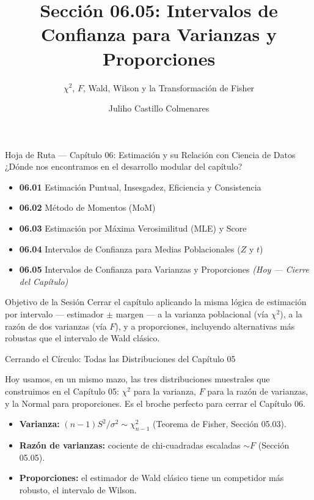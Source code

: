 \documentclass[10pt, aspectratio=169]{beamer}
\title[IC Varianzas y Proporciones]{Sección 06.05: Intervalos de Confianza para Varianzas y Proporciones}
\subtitle{$\chi^2$, $F$, Wald, Wilson y la Transformación de Fisher}
\author[J. Castillo Colmenares]{Juliho Castillo Colmenares}
\institute{Tecnológico de Monterrey}
\date{\vspace{-1.2cm}}
\begin{document}
\begin{frame}[plain]
  \vspace{-0.8cm}
  \titlepage
\end{frame}

\begin{frame}{Hoja de Ruta --- Capítulo 06: Estimación y su Relación con Ciencia de Datos}
  \footnotesize
  ¿Dónde nos encontramos en el desarrollo modular del capítulo? \pause
  \begin{itemize}\itemsep=0.08em
    \item \textbf{06.01} Estimación Puntual, Insesgadez, Eficiencia y Consistencia \pause
    \item \textbf{06.02} Método de Momentos (MoM) \pause
    \item \textbf{06.03} Estimación por Máxima Verosimilitud (MLE) y Score \pause
    \item \textbf{06.04} Intervalos de Confianza para Medias Poblacionales ($Z$ y $t$) \pause
    \item \textbf{06.05} Intervalos de Confianza para Varianzas y Proporciones \emph{(Hoy --- Cierre del Capítulo)}
  \end{itemize}
  \vspace{-0.05cm}
  \begin{block}{Objetivo de la Sesión}
    Cerrar el capítulo aplicando la misma lógica de estimación por intervalo --- estimador $\pm$ margen --- a la varianza poblacional (vía $\chi^2$), a la razón de dos varianzas (vía $F$), y a proporciones, incluyendo alternativas más robustas que el intervalo de Wald clásico.
  \end{block}
\end{frame}

\begin{frame}{Cerrando el Círculo: Todas las Distribuciones del Capítulo 05}
  \footnotesize
  \begin{motivacion}
    Hoy usamos, en un mismo mazo, las tres distribuciones muestrales que construimos en el Capítulo 05: $\chi^2$ para la varianza, $F$ para la razón de varianzas, y la Normal para proporciones. Es el broche perfecto para cerrar el Capítulo 06.
  \end{motivacion}

  \vspace{0.15cm}
  \pause
  \begin{itemize}\itemsep=0.1cm
    \item \textbf{Varianza:} $(n-1)S^2/\sigma^2 \sim \chi^2_{n-1}$ (Teorema de Fisher, Sección 05.03). \pause
    \item \textbf{Razón de varianzas:} cociente de chi-cuadradas escaladas $\sim F$ (Sección 05.05). \pause
    \item \textbf{Proporciones:} el estimador de Wald clásico tiene un competidor más robusto, el intervalo de Wilson.
  \end{itemize}
\end{frame}
\end{document}
